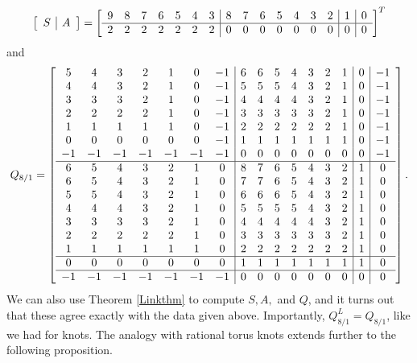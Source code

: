 \documentclass[11pt]{amsart}
\theoremstyle{plain}
\theoremstyle{definition}
\theoremstyle{remark}
\begin{document}
\[
\left[\begin{array}{ c | c }
   S & A \end{array}\right]=\left[\begin{array}{ c c c c c c c | c c c c c c c | c | c}
    9 & 8 & 7 & 6 & 5 & 4 & 3 & 8 & 7 & 6 & 5 & 4 & 3 & 2 & 1 & 0\\
    \hline
    2 & 2 & 2 & 2 & 2 & 2 & 2 & 0 & 0 & 0 & 0 & 0 & 0 & 0 & 0 & 0
    \end{array}\right]^T
\]
and 
\[
Q_{8/1}= 
\left[\begin{array}{ c c c c c c c | c c c c c c c | c | c}
    5 & 4 & 3 & 2 & 1 & 0 & -1 & 6 & 6 & 5 & 4 & 3 & 2 & 1 & 0 & -1\\
    4 & 4 & 3 & 2 & 1 & 0 & -1 & 5 & 5 & 5 & 4 & 3 & 2 & 1 & 0 & -1\\
    3 & 3 & 3 & 2 & 1 & 0 & -1 & 4 & 4 & 4 & 4 & 3 & 2 & 1 & 0 & -1\\
    2 & 2 & 2 & 2 & 1 & 0 & -1 & 3 & 3 & 3 & 3 & 3 & 2 & 1 & 0 & -1\\
    1 & 1 & 1 & 1 & 1 & 0 & -1 & 2 & 2 & 2 & 2 & 2 & 2 & 1 & 0 & -1\\
    0 & 0 & 0 & 0 & 0 & 0 & -1 & 1 & 1 & 1 & 1 & 1 & 1 & 1 & 0 & -1\\
    -1 & -1 & -1 & -1 & -1 & -1 & -1 & 0 & 0 & 0 & 0 & 0 & 0 & 0 & 0 & -1\\
    \hline
    6 & 5 & 4 & 3 & 2 & 1 & 0 & 8 & 7 & 6 & 5 & 4 & 3 & 2 & 1 & 0\\
    6 & 5 & 4 & 3 & 2 & 1 & 0 & 7 & 7 & 6 & 5 & 4 & 3 & 2 & 1 & 0\\
    5 & 5 & 4 & 3 & 2 & 1 & 0 & 6 & 6 & 6 & 5 & 4 & 3 & 2 & 1 & 0\\
    4 & 4 & 4 & 3 & 2 & 1 & 0 & 5 & 5 & 5 & 5 & 4 & 3 & 2 & 1 & 0\\
    3 & 3 & 3 & 3 & 2 & 1 & 0 & 4 & 4 & 4 & 4 & 4 & 3 & 2 & 1 & 0\\
    2 & 2 & 2 & 2 & 2 & 1 & 0 & 3 & 3 & 3 & 3 & 3 & 3 & 2 & 1 & 0\\
    1 & 1 & 1 & 1 & 1 & 1 & 0 & 2 & 2 & 2 & 2 & 2 & 2 & 2 & 1 & 0\\
    \hline
    0 & 0 & 0 & 0 & 0 & 0 & 0 & 1 & 1 &1 & 1 & 1 & 1 & 1 & 1 & 0\\
    \hline
    -1 & -1 & -1 & -1 & -1 & -1 & -1 & 0 & 0 & 0 & 0 & 0 & 0 & 0 & 0 & 0
    \end{array}\right].
\]
We can also use Theorem \ref{Linkthm} to compute $S,A,$ and $Q$, and it turns out that these agree exactly with the data given above. Importantly, $Q_{8/1}^L=Q_{8/1}$, like we had for knots. The analogy with rational torus knots extends further to the following proposition.
\end{document}

